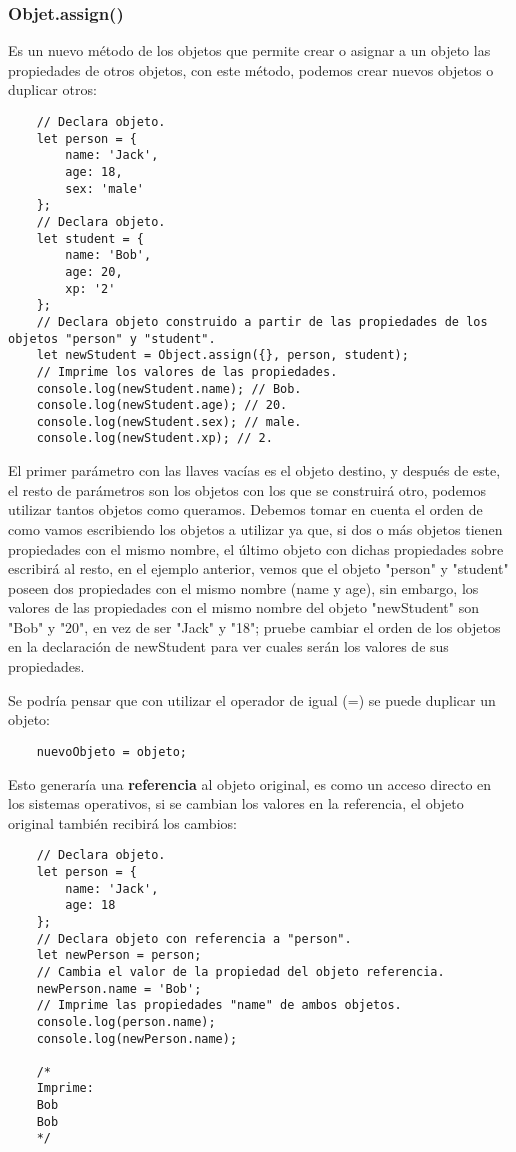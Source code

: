 \subsubsection{Objet.assign()}

Es un nuevo método de los objetos que permite crear o asignar a un objeto las propiedades de otros objetos, con este método, podemos crear nuevos objetos o duplicar otros:
\begin{lstlisting}
    // Declara objeto.
    let person = {
        name: 'Jack',
        age: 18,
        sex: 'male'
    };
    // Declara objeto.
    let student = {
        name: 'Bob',
        age: 20,
        xp: '2'
    };
    // Declara objeto construido a partir de las propiedades de los objetos "person" y "student".
    let newStudent = Object.assign({}, person, student);
    // Imprime los valores de las propiedades.
    console.log(newStudent.name); // Bob.
    console.log(newStudent.age); // 20.
    console.log(newStudent.sex); // male.
    console.log(newStudent.xp); // 2.
\end{lstlisting}

El primer parámetro con las llaves vacías es el objeto destino, y después de este, el resto de parámetros son los objetos con los que se construirá otro, podemos utilizar tantos objetos como queramos. Debemos tomar en cuenta el orden de como vamos escribiendo los objetos a utilizar ya que, si dos o más objetos tienen propiedades con el mismo nombre, el último objeto con dichas propiedades sobre escribirá al resto, en el ejemplo anterior, vemos que el objeto "person" y "student" poseen dos propiedades con el mismo nombre (name y age), sin embargo, los valores de las propiedades con el mismo nombre del objeto "newStudent" son "Bob" y "20", en vez de ser "Jack" y "18"; pruebe cambiar el orden de los objetos en la declaración de newStudent para ver cuales serán los valores de sus propiedades.

Se podría pensar que con utilizar el operador de igual (=) se puede duplicar un objeto:
\begin{lstlisting}
    nuevoObjeto = objeto;
\end{lstlisting}

Esto generaría una \textbf{referencia} al objeto original, es como un acceso directo en los sistemas operativos, si se cambian los valores en la referencia, el objeto original también recibirá los cambios:
\begin{lstlisting}
    // Declara objeto.
    let person = {
        name: 'Jack',
        age: 18
    };
    // Declara objeto con referencia a "person".
    let newPerson = person;
    // Cambia el valor de la propiedad del objeto referencia.
    newPerson.name = 'Bob';
    // Imprime las propiedades "name" de ambos objetos.
    console.log(person.name);
    console.log(newPerson.name);

    /*
    Imprime:
    Bob
    Bob
    */
\end{lstlisting}

